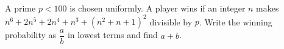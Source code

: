 A prime $p<100$ is chosen uniformly. A player wins if an integer $n$ makes $n^6+2n^5+2n^4+n^3+(n^2+n+1)^2$ divisible by $p$. Write the winning probability as $\dfrac{a}{b}$ in lowest terms and find $a+b$.
